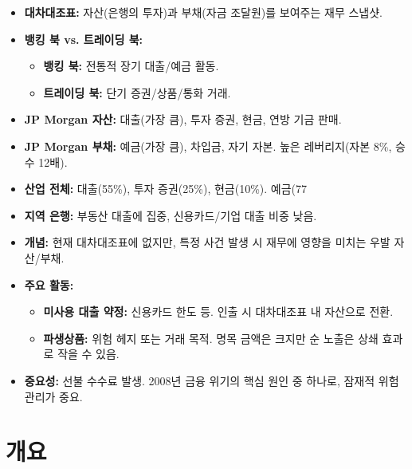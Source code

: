 \documentclass[11pt,a4paper]{article}
\theoremstyle{definition}
\begin{document}
\begin{tcolorbox}[title=\textbf{현대 은행의 재무제표 분석}]
\begin{itemize}
    \item \textbf{대차대조표:} 자산(은행의 투자)과 부채(자금 조달원)를 보여주는 재무 스냅샷.
    \item \textbf{뱅킹 북 vs. 트레이딩 북:}
    \begin{itemize}
        \item \textbf{뱅킹 북:} 전통적 장기 대출/예금 활동.
        \item \textbf{트레이딩 북:} 단기 증권/상품/통화 거래.
    \end{itemize}
    \item \textbf{JP Morgan 자산:} 대출(가장 큼), 투자 증권, 현금, 연방 기금 판매.
    \item \textbf{JP Morgan 부채:} 예금(가장 큼), 차입금, 자기 자본. 높은 레버리지(자본 8\%, 승수 12배).
    \item \textbf{산업 전체:} 대출(55\%), 투자 증권(25\%), 현금(10\%). 예금(77%
    \item \textbf{지역 은행:} 부동산 대출에 집중, 신용카드/기업 대출 비중 낮음.
\end{itemize}
\end{tcolorbox}

\begin{tcolorbox}[title=\textbf{대차대조표 외 활동 (OBS)}]
\begin{itemize}
    \item \textbf{개념:} 현재 대차대조표에 없지만, 특정 사건 발생 시 재무에 영향을 미치는 우발 자산/부채.
    \item \textbf{주요 활동:}
    \begin{itemize}
        \item \textbf{미사용 대출 약정:} 신용카드 한도 등. 인출 시 대차대조표 내 자산으로 전환.
        \item \textbf{파생상품:} 위험 헤지 또는 거래 목적. 명목 금액은 크지만 순 노출은 상쇄 효과로 작을 수 있음.
    \end{itemize}
    \item \textbf{중요성:} 선불 수수료 발생. 2008년 금융 위기의 핵심 원인 중 하나로, 잠재적 위험 관리가 중요.
\end{itemize}
\end{tcolorbox}

\newpage
\section{개요}
\end{document}
